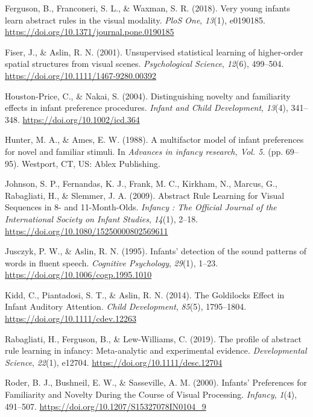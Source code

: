 \documentclass[english,man]{apa6}
\begin{document}
\leavevmode\hypertarget{ref-ferguson2018}{}%
Ferguson, B., Franconeri, S. L., \& Waxman, S. R. (2018). Very young infants learn abstract rules in the visual modality. \emph{PloS One}, \emph{13}(1), e0190185. \url{https://doi.org/10.1371/journal.pone.0190185}

\leavevmode\hypertarget{ref-fiser2001}{}%
Fiser, J., \& Aslin, R. N. (2001). Unsupervised statistical learning of higher-order spatial structures from visual scenes. \emph{Psychological Science}, \emph{12}(6), 499--504. \url{https://doi.org/10.1111/1467-9280.00392}

\leavevmode\hypertarget{ref-houston-price2004}{}%
Houston‐Price, C., \& Nakai, S. (2004). Distinguishing novelty and familiarity effects in infant preference procedures. \emph{Infant and Child Development}, \emph{13}(4), 341--348. \url{https://doi.org/10.1002/icd.364}

\leavevmode\hypertarget{ref-hunter1988}{}%
Hunter, M. A., \& Ames, E. W. (1988). A multifactor model of infant preferences for novel and familiar stimuli. In \emph{Advances in infancy research, Vol. 5.} (pp. 69--95). Westport, CT, US: Ablex Publishing.

\leavevmode\hypertarget{ref-johnson2009}{}%
Johnson, S. P., Fernandas, K. J., Frank, M. C., Kirkham, N., Marcus, G., Rabagliati, H., \& Slemmer, J. A. (2009). Abstract Rule Learning for Visual Sequences in 8- and 11-Month-Olds. \emph{Infancy : The Official Journal of the International Society on Infant Studies}, \emph{14}(1), 2--18. \url{https://doi.org/10.1080/15250000802569611}

\leavevmode\hypertarget{ref-jusczyk1995}{}%
Jusczyk, P. W., \& Aslin, R. N. (1995). Infants' detection of the sound patterns of words in fluent speech. \emph{Cognitive Psychology}, \emph{29}(1), 1--23. \url{https://doi.org/10.1006/cogp.1995.1010}

\leavevmode\hypertarget{ref-kidd2014}{}%
Kidd, C., Piantadosi, S. T., \& Aslin, R. N. (2014). The Goldilocks Effect in Infant Auditory Attention. \emph{Child Development}, \emph{85}(5), 1795--1804. \url{https://doi.org/10.1111/cdev.12263}

\leavevmode\hypertarget{ref-rabagliati2019}{}%
Rabagliati, H., Ferguson, B., \& Lew-Williams, C. (2019). The profile of abstract rule learning in infancy: Meta-analytic and experimental evidence. \emph{Developmental Science}, \emph{22}(1), e12704. \url{https://doi.org/10.1111/desc.12704}

\leavevmode\hypertarget{ref-roder2000}{}%
Roder, B. J., Bushneil, E. W., \& Sasseville, A. M. (2000). Infants' Preferences for Familiarity and Novelty During the Course of Visual Processing. \emph{Infancy}, \emph{1}(4), 491--507. \url{https://doi.org/10.1207/S15327078IN0104_9}
\end{document}
